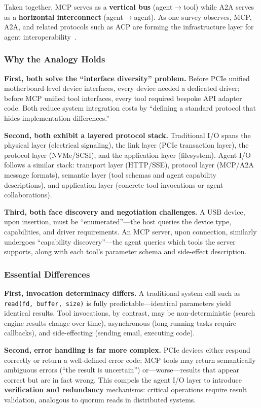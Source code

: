 \documentclass[11pt,a4paper]{article}
\begin{document}
Taken together, MCP serves as a \textbf{vertical bus} (agent$\to$tool) while A2A serves as a \textbf{horizontal interconnect} (agent$\to$agent).
As one survey observes, MCP, A2A, and related protocols such as ACP are forming the infrastructure layer for agent interoperability~\cite{agentprotocols2025}.

\subsubsection{Why the Analogy Holds}

\textbf{First, both solve the ``interface diversity'' problem.}
Before PCIe unified motherboard-level device interfaces, every device needed a dedicated driver; before MCP unified tool interfaces, every tool required bespoke API adapter code.
Both reduce system integration costs by ``defining a standard protocol that hides implementation differences.''

\textbf{Second, both exhibit a layered protocol stack.}
Traditional I/O spans the physical layer (electrical signaling), the link layer (PCIe transaction layer), the protocol layer (NVMe/SCSI), and the application layer (filesystem).
Agent I/O follows a similar stack: transport layer (HTTP/SSE), protocol layer (MCP/A2A message formats), semantic layer (tool schemas and agent capability descriptions), and application layer (concrete tool invocations or agent collaborations).

\textbf{Third, both face discovery and negotiation challenges.}
A USB device, upon insertion, must be ``enumerated''---the host queries the device type, capabilities, and driver requirements.
An MCP server, upon connection, similarly undergoes ``capability discovery''---the agent queries which tools the server supports, along with each tool's parameter schema and side-effect description.

\subsubsection{Essential Differences}

\textbf{First, invocation determinacy differs.}
A traditional system call such as \texttt{read(fd, buffer, size)} is fully predictable---identical parameters yield identical results.
Tool invocations, by contrast, may be non-deterministic (search engine results change over time), asynchronous (long-running tasks require callbacks), and side-effecting (sending email, executing code).

\textbf{Second, error handling is far more complex.}
PCIe devices either respond correctly or return a well-defined error code; MCP tools may return semantically ambiguous errors (``the result is uncertain'') or---worse---results that appear correct but are in fact wrong.
This compels the agent I/O layer to introduce \textbf{verification and redundancy} mechanisms: critical operations require result validation, analogous to quorum reads in distributed systems.
\end{document}
